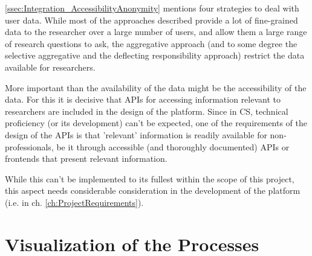 \ref{ssec:Integration_AccessibilityAnonymity} mentions four strategies to deal with user data. While most of the approaches described provide a lot of fine-grained data to the researcher over a large number of users, and allow them a large range of research questions to ask, the aggregative approach (and to some degree the selective aggregative and the deflecting responsibility approach) restrict the data available for researchers. 

More important than the availability of the data might be the accessibility of the data. For this it is decisive that APIs for accessing information relevant to researchers are included in the design of the platform. Since in CS, technical proficiency (or its development) can't be expected, one of the requirements of the design of the APIs is that 'relevant' information is readily available for non-professionals, be it through accessible (and thoroughly documented) APIs or frontends that present relevant information.

While this can't be implemented to its fullest within the scope of this project, this aspect needs considerable consideration in the development of the platform (i.e. in ch. \ref{ch:ProjectRequirements}).

\section{Visualization of the Processes}
\label{sec:Model_Visualization}